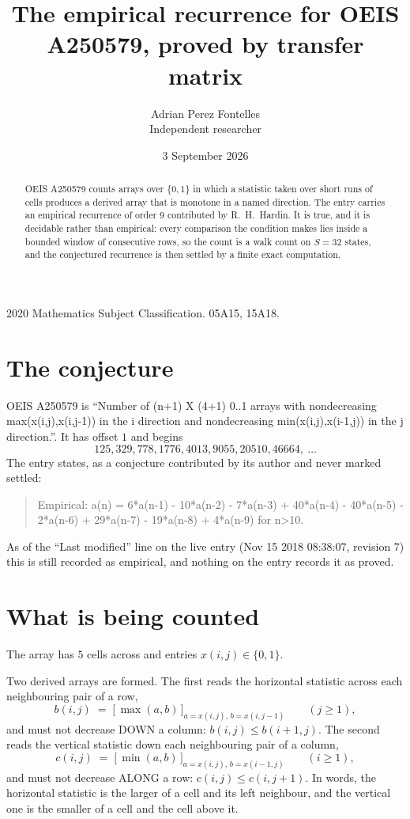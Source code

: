 \documentclass[11pt,a4paper]{article}
\title{The empirical recurrence for OEIS A250579, proved by transfer matrix}
\author{Adrian Perez Fontelles\\ \small Independent researcher}
\date{3 September 2026}
\theoremstyle{plain}
\theoremstyle{definition}
\begin{document}
\maketitle

\begin{abstract}
OEIS A250579 counts arrays over $\{0,1\}$ in which a statistic taken over short runs
of cells produces a derived array that is monotone in a named direction. The entry carries an
empirical recurrence of order $9$ contributed by R.~H.~Hardin. It is true, and it is
decidable rather than empirical: every comparison the condition makes lies inside a bounded
window of consecutive rows, so the count is a walk count on $S=32$ states, and the
conjectured recurrence is then settled by a finite exact computation.
\end{abstract}

\noindent\small 2020 Mathematics Subject Classification. 05A15, 15A18.\normalsize

\section{The conjecture}

OEIS A250579 is ``Number of (n+1) X (4+1) 0..1 arrays with nondecreasing max(x(i,j),x(i,j-1)) in the i direction and nondecreasing min(x(i,j),x(i-1,j)) in the j direction.''. It has offset $1$ and begins
\[
125, 329, 778, 1776, 4013, 9055, 20510, 46664,\ \dots
\]
The entry states, as a conjecture contributed by its author and never marked settled:
\begin{quote}
Empirical: a(n) = 6*a(n-1) - 10*a(n-2) - 7*a(n-3) + 40*a(n-4) - 40*a(n-5) - 2*a(n-6) + 29*a(n-7) - 19*a(n-8) + 4*a(n-9) for n>10.
\end{quote}
As of the ``Last modified'' line on the live entry (Nov 15 2018 08:38:07, revision 7) this is still
recorded as empirical, and nothing on the entry records it as proved.

\section{What is being counted}

The array has $5$ cells across and entries $x(i,j)\in\{0,1\}$.

Two derived arrays are formed. The first reads the horizontal statistic across each
neighbouring pair of a row,
\[
b(i,j)\;=\;\bigl[\,\max(a,b)\,\bigr]_{a=x(i,j),\,b=x(i,j-1)}\qquad (j\ge1),
\]
and must not decrease DOWN a column: $b(i,j)\le b(i{+}1,j)$. The second reads the vertical
statistic down each neighbouring pair of a column,
\[
c(i,j)\;=\;\bigl[\,\min(a,b)\,\bigr]_{a=x(i,j),\,b=x(i{-}1,j)}\qquad (i\ge1),
\]
and must not decrease ALONG a row: $c(i,j)\le c(i,j{+}1)$. In words, the horizontal statistic
is the larger of a cell and its left neighbour, and the vertical one is
the smaller of a cell and the cell above it.
\end{document}
